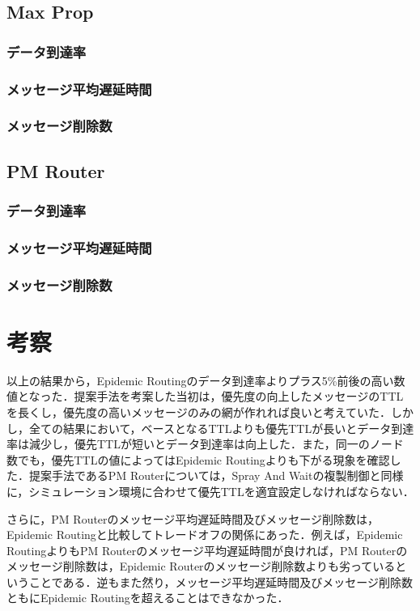 \documentclass[11pt]{icsthesis}
\begin{document}
\section{Max Prop}
\subsection{データ到達率}
\subsection{メッセージ平均遅延時間}
\subsection{メッセージ削除数}

\section{PM Router}
\subsection{データ到達率}
\subsection{メッセージ平均遅延時間}
\subsection{メッセージ削除数}

\chapter{考察}
以上の結果から，Epidemic Routingのデータ到達率よりプラス5\%前後の高い数値となった．提案手法を考案した当初は，優先度の向上したメッセージのTTLを長くし，優先度の高いメッセージのみの網が作れれば良いと考えていた．しかし，全ての結果において，ベースとなるTTLよりも優先TTLが長いとデータ到達率は減少し，優先TTLが短いとデータ到達率は向上した．また，同一のノード数でも，優先TTLの値によってはEpidemic Routingよりも下がる現象を確認した．提案手法であるPM Routerについては，Spray And Waitの複製制御と同様に，シミュレーション環境に合わせて優先TTLを適宜設定しなければならない．

さらに，PM Routerのメッセージ平均遅延時間及びメッセージ削除数は，Epidemic Routingと比較してトレードオフの関係にあった．例えば，Epidemic RoutingよりもPM Routerのメッセージ平均遅延時間が良ければ，PM Routerのメッセージ削除数は，Epidemic Routerのメッセージ削除数よりも劣っているということである．逆もまた然り，メッセージ平均遅延時間及びメッセージ削除数ともにEpidemic Routingを超えることはできなかった．
\end{document}
